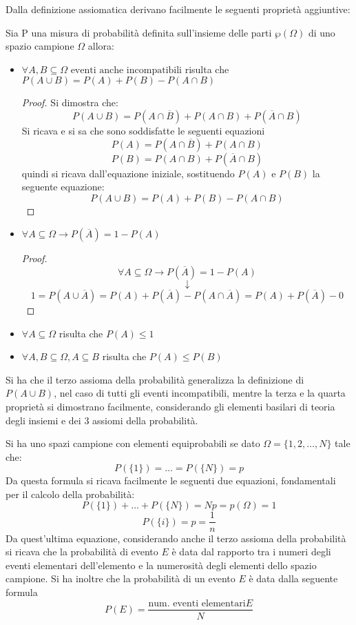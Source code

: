 \documentclass[a4paper,12pt, oneside]{book}
\begin{document}
Dalla definizione assiomatica derivano facilmente le seguenti proprietà aggiuntive:
\begin{definizione}
Sia P una misura di probabilità definita sull'insieme delle parti $\wp(\Omega)$ di uno
spazio campione $\Omega$ allora:
    \begin{itemize}
        \item $\forall A, B \subseteq \Omega \mbox{ eventi anche incompatibili}$ risulta che
                $P(A \cup B) = P(A) + P(B) - P(A \cap B)$
                \begin{proof}
                 Si dimostra che:
                \[ P(A \cup B) = P(A \cap \overline{B}) + P(A \cap B) + P(\overline{A} \cap B)\]
                 Si ricava e si sa che sono soddisfatte le seguenti equazioni
                 \[P(A) = P(A \cap \overline{B}) + P(A \cap B) \]
                 \[P(B) = P(A \cap B) + P(\overline{A} \cap B) \]
                        quindi si ricava dall'equazione iniziale, sostituendo $P(A)$ e $P(B)$ la seguente equazione:
                    \[P(A \cup B) = P(A) + P(B) - P(A \cap B)\]
                \end{proof}
        \item $\forall A \subseteq \Omega \to P(\overline{A}) = 1 - P(A)$
              \begin{proof}
                    \[  \forall A\subseteq \Omega \to P(\overline{A})=1-P(A)\]
                        \[\downarrow\]
                    \[ 1 = P(A \cup \overline{A} )= P(A) + P(\overline{A}) - P(A \cap \overline{A}) = P(A) + P(\overline{A}) - 0\]
              \end{proof}
        \item $\forall A\subseteq \Omega$ risulta che $ P(A)\leq 1$
        \item $\forall A,B\subseteq \Omega, A\subseteq B$ risulta che $P(A)\leq P(B)$
    \end{itemize}
\end{definizione}
Si ha che il terzo assioma della probabilità generalizza la definizione di $P(A \cup B)$,
nel caso di tutti gli eventi incompatibili, mentre la terza e la quarta proprietà si dimostrano facilmente,
considerando gli elementi basilari di teoria degli insiemi e dei 3 assiomi della probabilità.

Si ha uno spazi campione con elementi equiprobabili se dato $\Omega = \{1, 2, \dots, N\}$ tale che:
\[P(\{1\}) = \dots = P(\{N\}) = p \]
Da questa formula si ricava facilmente le seguenti due equazioni, fondamentali per il calcolo della probabilità:
\[P(\{1\}) + \dots + P(\{N\}) = Np = p(\Omega) = 1\]
\[P(\{i\}) = p = \frac{1}{n}\]
Da quest'ultima equazione, considerando anche il terzo assioma della probabilità si ricava che la probabilità
di evento $E$ è data dal rapporto tra i numeri degli eventi elementari dell'elemento e la numerosità degli
elementi dello spazio campione.\newline
Si ha inoltre che la probabilità di un evento $E$ è data dalla seguente formula
\[ P(E) = \frac{\mbox{num. eventi elementari} E}{N} \]
\end{document}
